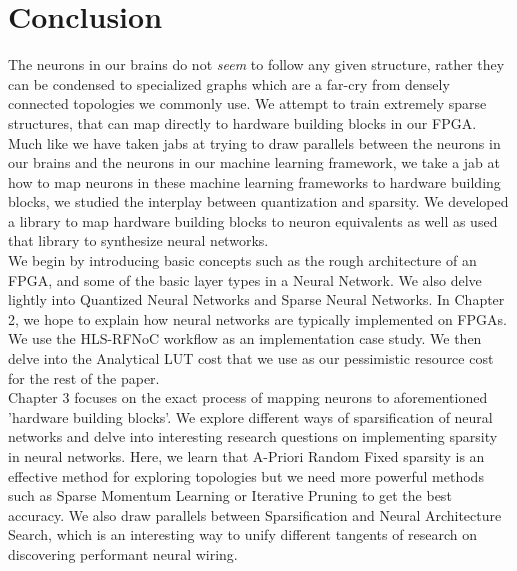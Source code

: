 \chapter{Conclusion}\label{ch:conclusion}

The neurons in our brains do not \textit{seem} to follow any given structure, rather they can be condensed to specialized graphs which are a far-cry from densely connected topologies we commonly use. We attempt to train extremely sparse structures, that can map directly to hardware building blocks in our FPGA. 
Much like we have taken jabs at trying to draw parallels between the neurons in our brains and the neurons in our machine learning framework, we take a jab at how to map neurons in these machine learning frameworks to hardware building blocks, we studied the interplay between quantization and sparsity. We developed a library to map hardware building blocks to neuron equivalents as well as used that library to synthesize neural networks. \\
We begin by introducing basic concepts such as the rough architecture of an FPGA, and some of the basic layer types in a Neural Network. We also delve lightly into Quantized Neural Networks and Sparse Neural Networks. In Chapter 2, we hope to explain how neural networks are typically implemented on FPGAs. We use the HLS-RFNoC workflow as an implementation case study. We then delve into the Analytical LUT cost that we use as our pessimistic resource cost for the rest of the paper.\\
Chapter 3 focuses on the exact process of mapping neurons to aforementioned 'hardware building blocks'. We explore different ways of sparsification of neural networks and delve into interesting research questions on implementing sparsity in neural networks. Here, we learn that A-Priori Random Fixed sparsity is an effective method for exploring topologies but we need more powerful methods such as Sparse Momentum Learning or Iterative Pruning to get the best accuracy. We also draw parallels between Sparsification and Neural Architecture Search, which is an interesting way to unify different tangents of research on discovering performant neural wiring.
